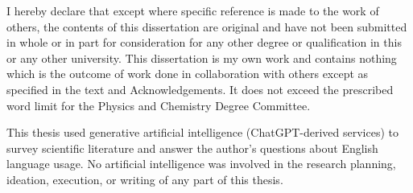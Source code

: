 
\begin{declaration}

I hereby declare that except where specific reference is made to the work of 
others, the contents of this dissertation are original and have not been 
submitted in whole or in part for consideration for any other degree or 
qualification in this or any other university. This dissertation is my own 
work and contains nothing which is the outcome of work done in collaboration 
with others except as specified in the text and Acknowledgements. It does 
not exceed the prescribed word limit for the Physics and Chemistry Degree Committee. 

This thesis used generative artificial intelligence (ChatGPT-derived services) to survey scientific literature and answer the author's questions about English language usage. No artificial intelligence was involved in the research planning, ideation, execution, or writing of any part of this thesis.


\end{declaration}

